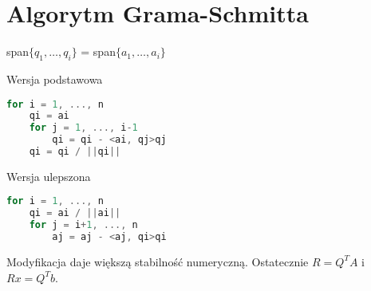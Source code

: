 \section{Algorytm Grama-Schmitta}
span\( \{q_1, \dots, q_i\} \) = span\( \{a_1, \dots, a_i\} \)
\begin{multicols}{2}
\noindent
Wersja podstawowa
\begin{lstlisting}[language=Cpp]
for i = 1, ..., n
    qi = ai
    for j = 1, ..., i-1
        qi = qi - <ai, qj>qj
    qi = qi / ||qi||
\end{lstlisting}
\columnbrake
Wersja ulepszona
\begin{lstlisting}[language=Cpp]
for i = 1, ..., n
    qi = ai / ||ai||
    for j = i+1, ..., n
        aj = aj - <aj, qi>qi
\end{lstlisting}
\end{multicols}
\noindent
Modyfikacja daje większą stabilność numeryczną. Ostatecznie \( R = Q^TA \) i \( Rx = Q^Tb \).